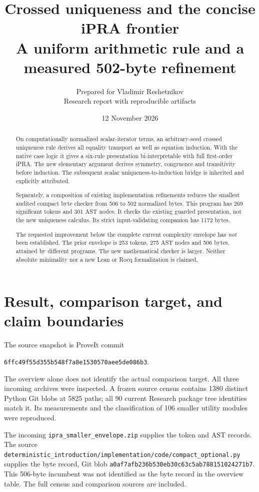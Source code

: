 \documentclass[11pt]{article}
\title{\textbf{Crossed uniqueness and the concise iPRA frontier}\\[5pt]
\large A uniform arithmetic rule and a measured 502-byte refinement}
\author{Prepared for Vladimir Reshetnikov\\
\small Research report with reproducible artifacts}
\date{12 November 2026}
\newcommand{\file}[1]{\nolinkurl{#1}}
\begin{document}
\maketitle
\begin{abstract}
On computationally normalized scalar-iterator terms, an arbitrary-seed
crossed uniqueness rule derives all equality transport as well as equation
induction. With the native case logic it gives a six-rule presentation
bi-interpretable with full first-order iPRA. The new elementary argument
derives symmetry, congruence and transitivity before induction. The
subsequent scalar uniqueness-to-induction bridge is inherited and
explicitly attributed.

Separately, a composition of existing implementation refinements reduces
the smallest audited compact byte checker from 506 to 502 normalized bytes.
This program has 269 significant tokens and 301 AST nodes. It checks the
existing guarded presentation, not the new uniqueness calculus. Its strict
input-validating companion has 1172 bytes.

The requested improvement below the complete current complexity envelope
has \emph{not} been established. The prior envelope is 253 tokens,
275 AST nodes and 506 bytes, attained by different programs. The new
mathematical checker is larger. Neither absolute minimality nor a new
Lean or Rocq formalization is claimed.
\end{abstract}
\tableofcontents
\newpage

\section{Result, comparison target, and claim boundaries}
The source snapshot is ProveIt commit
\begin{center}\small\texttt{6ffc49f55d355b548f7a8e1530570aee5de086b3}.\end{center}
The overview alone does not identify the actual comparison target.
All three incoming archives were inspected. A frozen source census
contains 1380 distinct Python Git blobs at 5825 paths; all 90 current
Research package tree identities match it. Its measurements and the
classification of 106 smaller utility modules were reproduced.

The incoming \file{ipra_smaller_envelope.zip} supplies the token and AST
records. The source
\file{deterministic_introduction/implementation/code/compact_optional.py}
supplies the byte record, Git blob
\texttt{a0af7afb236b530eb30c63c5ab788151024271b7}.
This 506-byte incumbent was not identified as the byte record in the
overview table. The full census and comparison sources are included.
\end{document}
